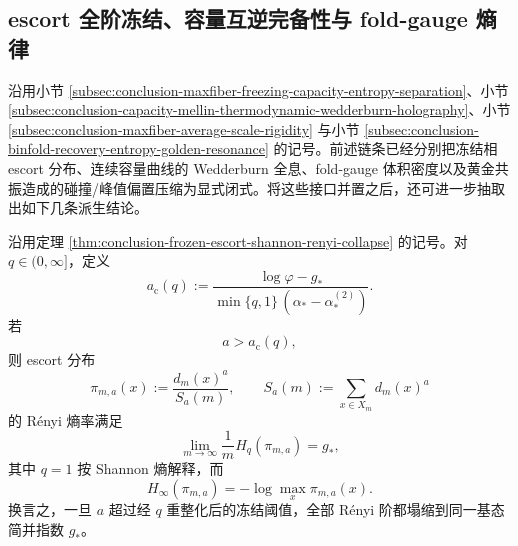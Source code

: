 \subsection{escort 全阶冻结、容量互逆完备性与 fold-gauge 熵律}\label{subsec:conclusion-escort-capacity-gauge-supermean-bernstein-mellin}
沿用小节 \ref{subsec:conclusion-maxfiber-freezing-capacity-entropy-separation}、小节 \ref{subsec:conclusion-capacity-mellin-thermodynamic-wedderburn-holography}、小节 \ref{subsec:conclusion-maxfiber-average-scale-rigidity} 与小节 \ref{subsec:conclusion-binfold-recovery-entropy-golden-resonance} 的记号。前述链条已经分别把冻结相 escort 分布、连续容量曲线的 Wedderburn 全息、fold-gauge 体积密度以及黄金共振造成的碰撞/峰值偏置压缩为显式闭式。将这些接口并置之后，还可进一步抽取出如下几条派生结论。

\begin{theorem}\label{thm:conclusion-escort-renyi-all-orders-renormalized-threshold}
沿用定理 \ref{thm:conclusion-frozen-escort-shannon-renyi-collapse} 的记号。对 \(q\in(0,\infty]\)，定义
\[
a_{\mathrm c}(q):=
\frac{\log\varphi-g_\ast}{\min\{q,1\}\,(\alpha_\ast-\alpha_\ast^{(2)})}.
\]
若
\[
a>a_{\mathrm c}(q),
\]
则 escort 分布
\[
\pi_{m,a}(x):=\frac{d_m(x)^a}{S_a(m)},
\qquad
S_a(m):=\sum_{x\in X_m}d_m(x)^a
\]
的 Rényi 熵率满足
\[
\lim_{m\to\infty}\frac1m H_q(\pi_{m,a})=g_\ast,
\]
其中 \(q=1\) 按 Shannon 熵解释，而
\[
H_\infty(\pi_{m,a})=-\log\max_x\pi_{m,a}(x).
\]
换言之，一旦 \(a\) 超过经 \(q\) 重整化后的冻结阈值，全部 Rényi 阶都塌缩到同一基态简并指数 \(g_\ast\)。
\end{theorem}
